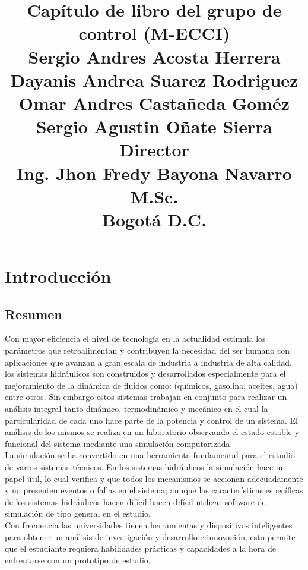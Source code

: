 \documentclass[a4paper,12pt,twoside]{proyectotanquesecci}
\title
{
\textbf{Capítulo de libro del grupo de control (M-ECCI)}\\
\vspace{3cm}
{\large 
Sergio Andres Acosta Herrera \\
Dayanis Andrea Suarez Rodriguez\\
Omar Andres Castañeda Goméz\\
Sergio Agustin Oñate Sierra\\}
\vspace{1cm}
\textbf{Director}\\
{\large Ing. Jhon Fredy Bayona Navarro M.Sc.}\\
\vspace{2cm}
{\large Bogotá D.C.}
}
\begin{document}
\maketitle
\renewcommand{\contentsname}{Tabla de Contenido}
\renewcommand{\listtablename}{Lista de Tablas}
\renewcommand{\listfigurename}{Lista de Figuras}
\tableofcontents
\listoftables
\listoffigures




\chapter{Introducción}

\section{Resumen}

Con mayor eficiencia el nivel de tecnología en la actualidad estimula los parámetros que retroalimentan y contribuyen la necesidad del ser humano con aplicaciones que avanzan a gran escala de industria a industria de alta calidad,  los sistemas hidráulicos son construidos y desarrollados especialmente para el mejoramiento de la dinámica de fluidos como: (químicos, gasolina, aceites, agua)  entre otros. Sin embargo estos sistemas trabajan en conjunto para realizar un análisis integral tanto dinámico, termodinámico y mecánico en el cual la particularidad de cada uno hace parte de la potencia y control de un sistema. El análisis de los mismos se realiza en un laboratorio observando el estado estable y funcional del sistema mediante una simulación computarizada.\\

La simulación se ha convertido en una herramienta fundamental para el estudio de varios sistemas técnicos. En los sistemas hidráulicos la simulación hace un papel útil, lo cual verifica y que todos los mecanismos se accionan adecuadamente y no presenten eventos o fallas en el sistema; aunque las características específicas de los sistemas hidráulicos hacen difícil hacen difícil utilizar software de simulación de tipo general en el estudio.\\

Con frecuencia las universidades tienen herramientas y dispositivos inteligentes para obtener un análisis de investigación y desarrollo e innovación, esto permite que el estudiante requiera habilidades prácticas y capacidades a la hora de enfrentarse con un prototipo de estudio.\\
\end{document}
